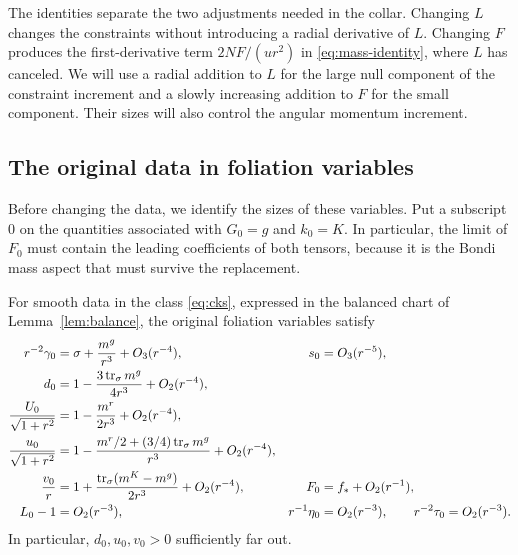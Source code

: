 The identities separate the two adjustments needed in the collar.
Changing $L$ changes the constraints without introducing a radial
derivative of $L$. Changing $F$ produces the first-derivative term
$2NF/(ur^2)$ in \eqref{eq:mass-identity}, where $L$ has canceled.
We will use a radial addition to $L$ for the large null component of
the constraint increment and a slowly increasing addition to $F$ for
the small component. Their sizes will also control the angular
momentum increment.

\subsection{The original data in foliation variables}

Before changing the data, we identify the sizes of these variables.
Put a subscript $0$ on the quantities associated with $G_0=g$ and
$k_0=K$. In particular, the limit of $F_0$ must contain the leading
coefficients of both tensors, because it is the Bondi mass aspect
that must survive the replacement.

\begin{lemma}\label{lem:original-asymptotics}
For smooth data in the class \eqref{eq:cks}, expressed in the balanced
chart of Lemma~\ref{lem:balance}, the original foliation variables satisfy
\begin{equation}\label{eq:original-asymptotics}
 \begin{aligned}
 r^{-2}\gamma_0
  &=\sigma+\frac{m^g}{r^3}+O_3(r^{-4}),
       &s_0&=O_3(r^{-5}),\\
 d_0&=1-\frac{3\operatorname{tr}_\sigma m^g}{4r^3}+O_2(r^{-4}),\\
 \frac{U_0}{\sqrt{1+r^2}}
  &=1-\frac{m^r}{2r^3}+O_2(r^{-4}),\\
 \frac{u_0}{\sqrt{1+r^2}}
  &=1-\frac{m^r/2+(3/4)\operatorname{tr}_\sigma m^g}{r^3}
       +O_2(r^{-4}),\\
 \frac{v_0}{r}
  &=1+\frac{\operatorname{tr}_\sigma(m^K-m^g)}{2r^3}+O_2(r^{-4}),
       &F_0&=f_*+O_2(r^{-1}),\\
 L_0-1&=O_2(r^{-3}),
       &r^{-1}\eta_0&=O_2(r^{-3}),\qquad
         r^{-2}\tau_0=O_2(r^{-3}).
 \end{aligned}
\end{equation}
In particular, $d_0,u_0,v_0>0$ sufficiently far out.
\end{lemma}


